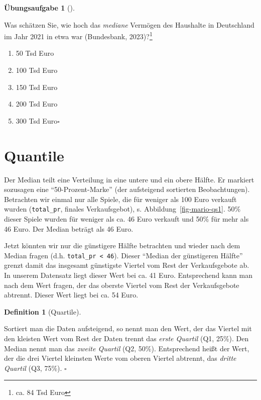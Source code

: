 \documentclass[
  letterpaper,
  oneside,
  open=any]{scrbook}
\providecommand{\tightlist}{%
  \setlength{\itemsep}{0pt}\setlength{\parskip}{0pt}}\usepackage{longtable,booktabs,array}
\theoremstyle{definition}
\newtheorem{exercise}{Übungsaufgabe}[chapter]
\theoremstyle{definition}
\theoremstyle{definition}
\newtheorem{definition}{Definition}[chapter]
\theoremstyle{remark}
\begin{document}
\begin{exercise}[]\protect\hypertarget{exr-mw-wealthmd}{}\label{exr-mw-wealthmd}

Was schätzen Sie, wie hoch das \emph{mediane} Vermögen des Haushalte in
Deutschland im Jahr 2021 in etwa war (Bundesbank, 2023)?\footnote{ca. 84
  Tsd Euro}

\begin{enumerate}
\def\labelenumi{\alph{enumi})}
\tightlist
\item
  50 Tsd Euro
\item
  100 Tsd Euro
\item
  150 Tsd Euro
\item
  200 Tsd Euro
\item
  300 Tsd Euro\(\square\)
\end{enumerate}

\end{exercise}

\section{Quantile}\label{quantile}

Der Median teilt eine Verteilung in eine untere und ein obere Hälfte. Er
markiert sozusagen eine \enquote{50-Prozent-Marke} (der aufsteigend
sortierten Beobachtungen). Betrachten wir einmal nur alle Spiele, die
für weniger als 100 Euro verkauft wurden (\texttt{total\_pr}, finales
Verkaufsgebot), s. Abbildung~\ref{fig-mario-qs1}. 50\% dieser Spiele
wurden für weniger als ca. 46 Euro verkauft und 50\% für mehr als 46
Euro. Der Median beträgt als 46 Euro.

Jetzt könnten wir nur die günstigere Hälfte betrachten und wieder nach
dem Median fragen (d.h. \texttt{total\_pr\ \textless{}\ 46}). Dieser
\enquote{Median der günstigeren Hälfte} grenzt damit das insgesamt
günstigste Viertel vom Rest der Verkaufsgebote ab. In unserem Datensatz
liegt dieser Wert bei ca. 41 Euro. Entsprechend kann man nach dem Wert
fragen, der das oberste Viertel vom Rest der Verkaufsgebote abtrennt.
Dieser Wert liegt bei ca. 54 Euro.

\begin{definition}[Quartile]\protect\hypertarget{def-quartile}{}\label{def-quartile}

Sortiert man die Daten aufsteigend, so nennt man den Wert, der das
Viertel mit den kleisten Wert vom Rest der Daten trennt das \emph{erste
Quartil} (Q1, 25\%). Den Median nennt man das \emph{zweite Quartil} (Q2,
50\%). Entsprechend heißt der Wert, der die drei Viertel kleinsten Werte
vom oberen Viertel abtrennt, das \emph{dritte Quartil} (Q3, 75\%).
\(\square\)

\end{definition}
\end{document}
